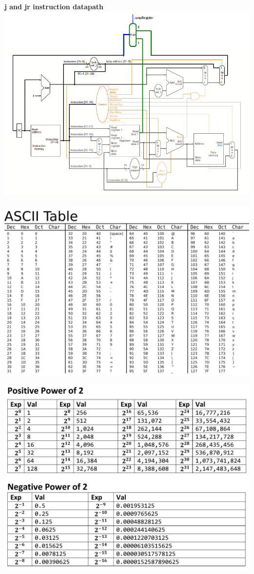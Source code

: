 \documentclass[10pt,landscape,a4paper]{article}
\begin{document}
\begin{multicols*}{3}
\textbf{j and jr instruction datapath}\\
\includegraphics[scale=0.34]{j_instr.png}\\\\
\includegraphics[scale=0.4]{ascii.jpg}
\begin{center}
    \includegraphics[width=\columnwidth]{powers_of_2.jpg}
\end{center}

\end{multicols*}
\end{document}
